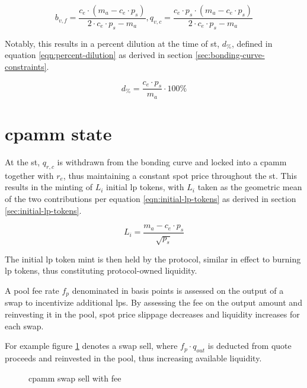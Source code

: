 \documentclass[table, twocolumn]{article}
\begin{document}
\begin{equation} \label{eqn:bonding-curve-transition}
  b_{v, f} = \frac{c_e \cdot (m_a - c_e \cdot p_s)}{2 \cdot c_e \cdot p_s - m_a},
  q_{v, c} = \frac{c_e \cdot p_s \cdot(m_a - c_e \cdot p_s)}
  {2 \cdot c_e \cdot p_s - m_a}
\end{equation}

Notably, this results in a percent dilution at the time of \gls*{st}, $d_\%$, defined in
equation \ref{eqn:percent-dilution} as derived in section
\ref{sec:bonding-curve-constraints}.

\begin{equation} \label{eqn:percent-dilution}
  d_\% = \frac{c_e \cdot p_s}{m_a} \cdot 100\%
\end{equation}

\section{\gls*{cpamm} state} \label{sec:cpamm-state}

At the \gls*{st}, $q_{r, c}$ is withdrawn from the bonding curve and locked into a
\gls*{cpamm} together with $r_e$, thus maintaining a constant spot price throughout
the \gls*{st}. This results in the minting of $L_i$ initial \gls*{lp} tokens, with $L_i$
taken as the geometric mean of the two contributions per equation
\ref{eqn:initial-lp-tokens} as derived in section \ref{sec:initial-lp-tokens}.

\begin{equation} \label{eqn:initial-lp-tokens}
  L_i = \frac{m_a - c_e \cdot p_s}{\sqrt{p_s}}
\end{equation}

The initial \gls*{lp} token mint is then held by the protocol, similar in effect to
burning \gls*{lp} tokens, thus constituting protocol-owned liquidity.

A pool fee rate $f_p$ denominated in basis points is assessed on the output of a swap to
incentivize additional \gls*{lp}s.  By assessing the fee on the output amount and
reinvesting it in the pool, spot price slippage decreases and liquidity increases for
each swap.

For example figure \ref{fig:cpamm-swap-sell-with-fee} denotes a swap sell, where
$f_p \cdot q_{out}$ is deducted from quote proceeds and reinvested in the pool, thus
increasing available liquidity.

\begin{figure}[!htb]
  \centering
  
  \caption{\gls*{cpamm} swap sell with fee}
  \label{fig:cpamm-swap-sell-with-fee}
\end{figure}
\end{document}
